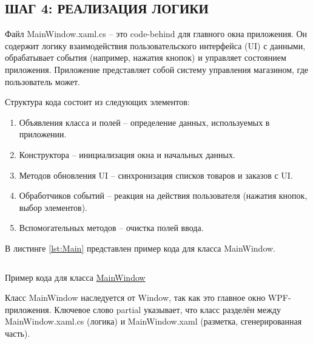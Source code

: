 \documentclass[12pt]{article}
\newcommand{\colorGIT}[1]{\textcolor{CtpLavender}{#1}}
\renewcommand{\texttt}[1]{{\small\ttfamily #1}}
\numberwithin{listing}{section}
\numberwithin{figure}{section}
\begin{document}

\newpage

\subsection{ШАГ 4: РЕАЛИЗАЦИЯ ЛОГИКИ}

Файл \texttt{MainWindow.xaml.cs} -- это \texttt{code-behind} для главного окна приложения. Он содержит логику взаимодействия пользовательского интерфейса (\texttt{UI}) с данными, обрабатывает события (например, нажатия кнопок) и управляет состоянием приложения. Приложение представляет собой систему управления магазином, где пользователь может.

Структура кода состоит из следующих элементов:
\begin{enumerate}
	\item Объявления класса и полей -- определение данных, используемых в приложении.
	\item Конструктора -- инициализация окна и начальных данных.
	\item Методов обновления \texttt{UI} -- синхронизация списков товаров и заказов с \texttt{UI}.
	\item Обработчиков событий -- реакция на действия пользователя (нажатия кнопок, выбор элементов).
	\item Вспомогательных методов -- очистка полей ввода.
\end{enumerate}
В листинге \ref{lst:Main} представлен пример кода для класса \texttt{MainWindow}.

\begin{listing}[H]
	\inputminted[firstline=1, lastline=21]{csharp}{../../3lab/StoreManager/MainWindow.xaml.cs}
	\caption{Пример кода для класса \colorGIT{\href{https://github.com/WebMasterIT/Csharp_Labs/blob/ec375afd16c0647b337cf3d8a79c8bef904fc1be/3lab/StoreManager/MainWindow.xaml.cs\#L1-L21}{MainWindow}}}
	\label{lst:Main}
\end{listing}

Класс \texttt{MainWindow} наследуется от \texttt{Window}, так как это главное окно \texttt{WPF}-приложения. Ключевое слово \texttt{partial} указывает, что класс разделён между \texttt{MainWindow.xaml.cs} (логика) и \texttt{MainWindow\-.xaml} (разметка, сгенерированная часть).
\end{document}
